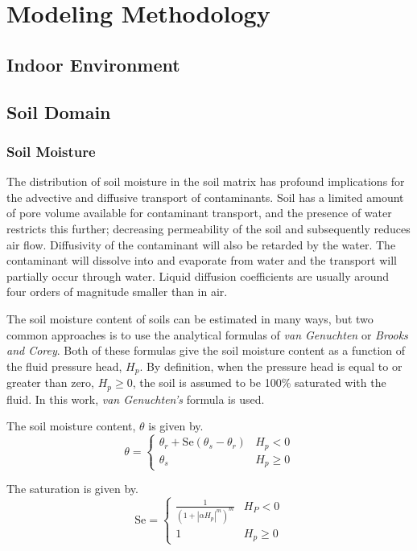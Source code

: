 \documentclass[../main.tex]{subfiles}
\begin{document}
\chapter{Modeling Methodology}


\section{Indoor Environment}

\section{Soil Domain}

\subsection{Soil Moisture}

The distribution of soil moisture in the soil matrix has profound implications for the advective and diffusive transport of contaminants.
Soil has a limited amount of pore volume available for contaminant transport, and the presence of water restricts this further; decreasing permeability of the soil and subsequently reduces air flow.
Diffusivity of the contaminant will also be retarded by the water.
The contaminant will dissolve into and evaporate from water and the transport will partially occur through water.
Liquid diffusion coefficients are usually around four orders of magnitude smaller than in air.

The soil moisture content of soils can be estimated in many ways, but two common approaches is to use the analytical formulas of \textit{van Genuchten} or \textit{Brooks and Corey}.
Both of these formulas give the soil moisture content as a function of the fluid pressure head, $H_p$.
By definition, when the pressure head is equal to or greater than zero, $H_p \geq 0$, the soil is assumed to be 100\% saturated with the fluid.
In this work, \textit{van Genuchten's} formula is used.

The soil moisture content, $\theta$ is given by.
\begin{equation}
  \theta = \begin{cases}
    \theta_r + \mathrm{Se}(\theta_s - \theta_r) & H_p < 0 \\
    \theta_s & H_p \geq 0
\end{cases}
\end{equation}

The saturation is given by.
\begin{equation}
  \mathrm{Se} = \begin{cases}
    \frac{1}{(1 + |\alpha H_p|^m)^m} & H_P < 0 \\
    1 & H_p \geq 0
  \end{cases}
\end{equation}
\end{document}
